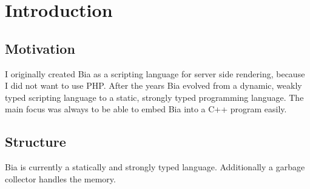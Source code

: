 
\chapter{Introduction}
\section{Motivation}
I originally created Bia as a scripting language for server side rendering, because I did not want to use PHP. After the years Bia evolved from a dynamic, weakly typed scripting language to a static, strongly typed programming language. The main focus was always to be able to embed Bia into a C++ program easily.

\section{Structure}
Bia is currently a statically and strongly typed language. Additionally a garbage collector handles the memory.
